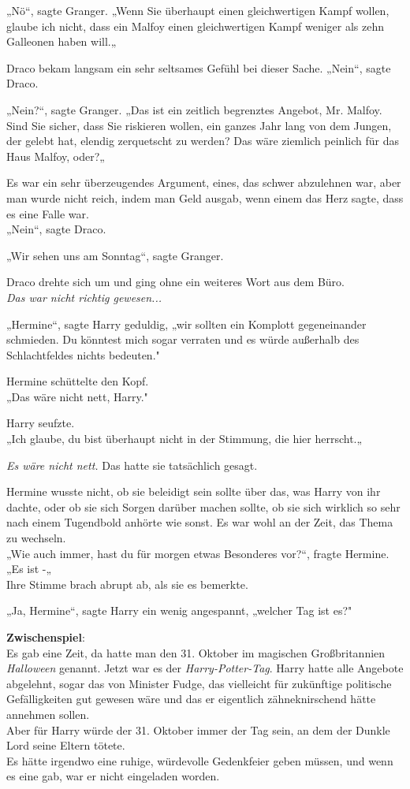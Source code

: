 {„Nö“, sagte Granger. „Wenn Sie überhaupt einen gleichwertigen Kampf wollen, glaube ich nicht, dass ein Malfoy einen gleichwertigen Kampf weniger als zehn Galleonen haben will.„

Draco bekam langsam ein sehr seltsames Gefühl bei dieser Sache. „Nein“, sagte Draco.

„Nein?“, sagte Granger. „Das ist ein zeitlich begrenztes Angebot, Mr. Malfoy.\\ Sind Sie sicher, dass Sie riskieren wollen, ein ganzes Jahr lang von dem Jungen, der gelebt hat, elendig zerquetscht zu werden? Das wäre ziemlich peinlich für das Haus Malfoy, oder?„

Es war ein sehr überzeugendes Argument, eines, das schwer abzulehnen war, aber man wurde nicht reich, indem man Geld ausgab, wenn einem das Herz sagte, dass es eine Falle war.\\ „Nein“, sagte Draco.

„Wir sehen uns am Sonntag“, sagte Granger.

Draco drehte sich um und ging ohne ein weiteres Wort aus dem Büro.\\ \emph{Das war nicht richtig gewesen...}

„Hermine“, sagte Harry geduldig, „wir sollten ein Komplott gegeneinander schmieden. Du könntest mich sogar verraten und es würde außerhalb des Schlachtfeldes nichts bedeuten."

Hermine schüttelte den Kopf.\\ „Das wäre nicht nett, Harry."

Harry seufzte.\\ „Ich glaube, du bist überhaupt nicht in der Stimmung, die hier herrscht.„

\emph{Es wäre nicht nett.} Das hatte sie tatsächlich gesagt.

Hermine wusste nicht, ob sie beleidigt sein sollte über das, was Harry von ihr dachte, oder ob sie sich Sorgen darüber machen sollte, ob sie sich wirklich so sehr nach einem Tugendbold anhörte wie sonst. Es war wohl an der Zeit, das Thema zu wechseln.\\ „Wie auch immer, hast du für morgen etwas Besonderes vor?“, fragte Hermine.\\ „Es ist -„\\ Ihre Stimme brach abrupt ab, als sie es bemerkte.

„Ja, Hermine“, sagte Harry ein wenig angespannt, „welcher Tag ist es?"

\textbf{Zwischenspiel}:\\ Es gab eine Zeit, da hatte man den 31. Oktober im magischen Großbritannien \emph{Halloween} genannt. Jetzt war es der \emph{Harry-Potter-Tag}. Harry hatte alle Angebote abgelehnt, sogar das von Minister Fudge, das vielleicht für zukünftige politische Gefälligkeiten gut gewesen wäre und das er eigentlich zähneknirschend hätte annehmen sollen.\\ Aber für Harry würde der 31. Oktober immer der Tag sein, an dem der Dunkle Lord seine Eltern tötete.\\ Es hätte irgendwo eine ruhige, würdevolle Gedenkfeier geben müssen, und wenn es eine gab, war er nicht eingeladen worden.

}
